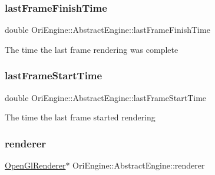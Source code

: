 \hypertarget{class_ori_engine_1_1_abstract_engine_a8b839c3500a3156be543f1119f280a81}{}\label{class_ori_engine_1_1_abstract_engine_a8b839c3500a3156be543f1119f280a81} 
\subsubsection{\texorpdfstring{last\+Frame\+Finish\+Time}{lastFrameFinishTime}}
{\footnotesize\ttfamily double Ori\+Engine\+::\+Abstract\+Engine\+::last\+Frame\+Finish\+Time\hspace{0.3cm}{\ttfamily [private]}}

The time the last frame rendering was complete \hypertarget{class_ori_engine_1_1_abstract_engine_a28d43c329a702901905e6b2aee2f23f7}{}\label{class_ori_engine_1_1_abstract_engine_a28d43c329a702901905e6b2aee2f23f7} 
\subsubsection{\texorpdfstring{last\+Frame\+Start\+Time}{lastFrameStartTime}}
{\footnotesize\ttfamily double Ori\+Engine\+::\+Abstract\+Engine\+::last\+Frame\+Start\+Time\hspace{0.3cm}{\ttfamily [private]}}

The time the last frame started rendering \hypertarget{class_ori_engine_1_1_abstract_engine_ab1a0fbe17c1ddf528a9863b8b3e19d41}{}\label{class_ori_engine_1_1_abstract_engine_ab1a0fbe17c1ddf528a9863b8b3e19d41} 
\subsubsection{\texorpdfstring{renderer}{renderer}}
{\footnotesize\ttfamily \hyperlink{class_ori_engine_1_1_open_gl_renderer}{Open\+Gl\+Renderer}$\ast$ Ori\+Engine\+::\+Abstract\+Engine\+::renderer}

